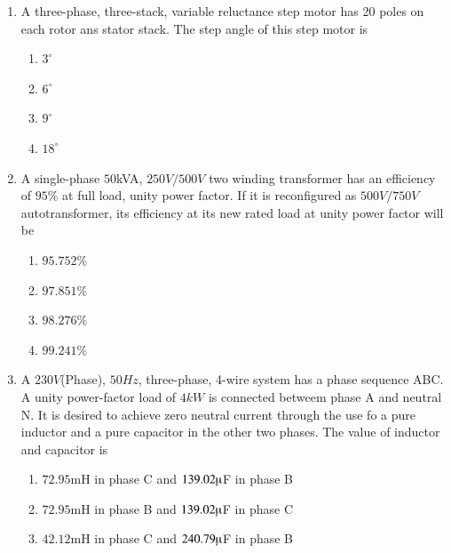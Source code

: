 \documentclass[journal,12pt,twocolumn]{IEEEtran}
\theoremstyle{remark}
\begin{document}
\begin{enumerate}
\begin{multicols}{2}
\begin{enumerate}
    \item $1.731$
    \item $1.5$
    \item $0.666$
    \item $0.577$
\end{enumerate}    
\end{multicols}
\item A three-phase, three-stack, variable reluctance step motor has 20 poles on each rotor ans stator stack. The step angle of this step motor is
\begin{multicols}{2}
\begin{enumerate}
    \item $3^\circ$
    \item $6^\circ$
    \item $9^\circ$
    \item $18^\circ$
\end{enumerate}    
\end{multicols}
\item A single-phase $50$kVA, $250V/500V$ two winding transformer has an efficiency of $95\%$ at full load, unity power factor. If it is reconfigured as $500V/750V$ autotransformer, its efficiency at its new rated load at unity power factor will be 
\begin{multicols}{2}
\begin{enumerate}
  \item $95.752\%$
    \item $97.851\%$
    \item $98.276\%$
    \item $99.241\%$
\end{enumerate}    
\end{multicols}
\item A $230V$(Phase), $50Hz$, three-phase, 4-wire system has a phase sequence ABC. A unity power-factor load of $4kW$ is connected betweem phase A and neutral N. It is desired to achieve zero neutral current through the use fo a pure inductor and a pure capacitor in the other two phases. The value of inductor and capacitor is 
\begin{enumerate}
    \item $72.95$mH in phase C and $139.02\micro$F in phase B
     \item $72.95$mH in phase B and $139.02\micro$F in phase C
      \item $42.12$mH in phase C and $240.79\micro$F in phase B

\end{enumerate}
\end{enumerate}
\end{document}
